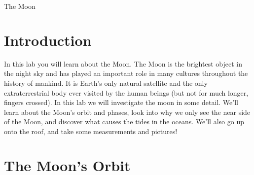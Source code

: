 \documentclass[12pt]{article}%
\begin{document}
\begin{center}
    \LARGE The Moon
\end{center}

\section{Introduction}
In this lab you will learn about the Moon. 
The Moon is the brightest object in the night sky and has played an important role in many cultures throughout the history of mankind. 
It is Earth's only natural satellite and the only extraterrestrial body ever visited by the human beings (but not for much longer, fingers crossed).
In this lab we will investigate the moon in some detail. 
We'll learn about the Moon's orbit and phases, look into why we only see the near side of the Moon, and discover what causes the tides in the oceans. 
We'll also go up onto the roof, and take some measurements and pictures! 


\section{The Moon's Orbit}
\end{document}
